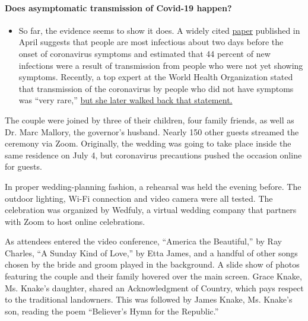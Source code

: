 \begin{itemize}
{  \paragraph{Does asymptomatic transmission of Covid-19
  happen?}\label{does-asymptomatic-transmission-of-covid-19-happen}}

  \begin{itemize}
  \tightlist
  \item
    So far, the evidence seems to show it does. A widely cited
    \href{https://www.nature.com/articles/s41591-020-0869-5}{paper}
    published in April suggests that people are most infectious about
    two days before the onset of coronavirus symptoms and estimated that
    44 percent of new infections were a result of transmission from
    people who were not yet showing symptoms. Recently, a top expert at
    the World Health Organization stated that transmission of the
    coronavirus by people who did not have symptoms was ``very rare,''
    \href{https://www.nytimes3xbfgragh.onion/2020/06/09/world/coronavirus-updates.html?action=click\&pgtype=Article\&state=default\&region=MAIN_CONTENT_3\&context=storylines_faq\#link-1f302e21}{but
    she later walked back that statement.}
  \end{itemize}
\end{itemize}

The couple were joined by three of their children, four family friends,
as well as Dr. Marc Mallory, the governor's husband. Nearly 150 other
guests streamed the ceremony via Zoom. Originally, the wedding was going
to take place inside the same residence on July 4, but coronavirus
precautions pushed the occasion online for guests.

In proper wedding-planning fashion, a rehearsal was held the evening
before. The outdoor lighting, Wi-Fi connection and video camera were all
tested. The celebration was organized by Wedfuly, a virtual wedding
company that partners with Zoom to host online celebrations.

As attendees entered the video conference, ``America the Beautiful,'' by
Ray Charles, ``A Sunday Kind of Love,'' by Etta James, and a handful of
other songs chosen by the bride and groom played in the background. A
slide show of photos featuring the couple and their family hovered over
the main screen. Grace Knake, Ms. Knake's daughter, shared an
Acknowledgment of Country, which pays respect to the traditional
landowners. This was followed by James Knake, Ms. Knake's son, reading
the poem ``Believer's Hymn for the Republic.''

